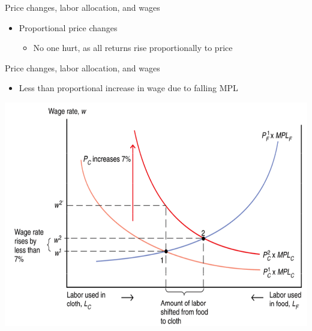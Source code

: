 \documentclass[ignorenonframetext,]{beamer}
\begin{document}
\begin{frame}{Price changes, labor allocation, and wages}

    \begin{itemize}
        \item Proportional price changes
        \begin{itemize}
            \item No one hurt, as all returns rise proportionally to price
        \end{itemize}
    \end{itemize}

\end{frame}

\begin{frame}{Price changes, labor allocation, and wages}
    \begin{itemize}
        \item Less than proportional increase in wage due to falling MPL 
    \end{itemize}

    \includegraphics[scale=0.25]{rel_price_change.png}

\end{frame}
\end{document}
